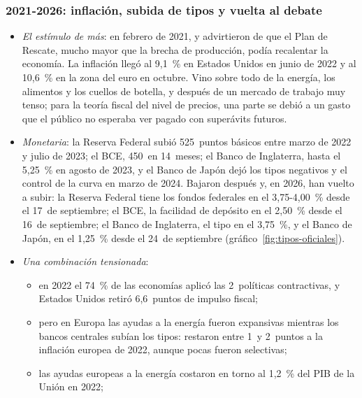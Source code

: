 \documentclass[11pt]{article}
\begin{document}
\subsubsection{2021-2026: inflación, subida de tipos y vuelta al debate}\label{sec:fase-inflacion}

\begin{itemize}
\item \emph{El estímulo de más}: en febrero de 2021,  y  advirtieron de que el Plan de Rescate, mucho mayor que la brecha de producción, podía recalentar la economía\nocite{Summers2021Biden,Blanchard2021Defense}. La inflación llegó al 9,1~\% en Estados Unidos en junio de 2022\nocite{BLS2026IPC} y al 10,6~\% en la zona del euro en octubre\nocite{Eurostat2026IAPC}. Vino sobre todo de la energía, los alimentos y los cuellos de botella, y después de un mercado de trabajo muy tenso\nocite{BernankeBlanchard2025What}; para la teoría fiscal del nivel de precios, una parte se debió a un gasto que el público no esperaba ver pagado con superávits futuros\nocite{BianchiFacciniMelosi2023}.
\item \emph{Monetaria}: la Reserva Federal subió 525~puntos básicos entre marzo de 2022 y julio de 2023; el BCE, 450~en 14~meses; el Banco de Inglaterra, hasta el 5,25~\% en agosto de 2023, y el Banco de Japón dejó los tipos negativos y el control de la curva en marzo de 2024\nocite{FedNY2026EFFR,BCE2026Tipos,BoE2026BankRate,BoJ2024Marco}. Bajaron después y, en 2026, han vuelto a subir: la Reserva Federal tiene los fondos federales en el 3,75-4,00~\% desde el 17~de septiembre; el BCE, la facilidad de depósito en el 2,50~\% desde el 16~de septiembre; el Banco de Inglaterra, el tipo en el 3,75~\%, y el Banco de Japón, en el 1,25~\% desde el 24~de septiembre (gráfico~\ref{fig:tipos-oficiales})\nocite{BoJ2026Octubre}.
\item \emph{Una combinación tensionada}:
  \begin{itemize}
  \item en 2022 el 74~\% de las economías aplicó las 2~políticas contractivas\nocite{FMI2023FiscalMonitor}, y Estados Unidos retiró 6,6~puntos de impulso fiscal\nocite{FMI2026FMdatos};
  \item pero en Europa las ayudas a la energía fueron expansivas mientras los bancos centrales subían los tipos: restaron entre 1~y 2~puntos a la inflación europea de 2022, aunque pocas fueron selectivas\nocite{DaoEtAl2023Unconventional};
  \item las ayudas europeas a la energía costaron en torno al 1,2~\% del PIB de la Unión en 2022\nocite{CE2022Otono};

\end{itemize}
\end{itemize}
\end{document}
